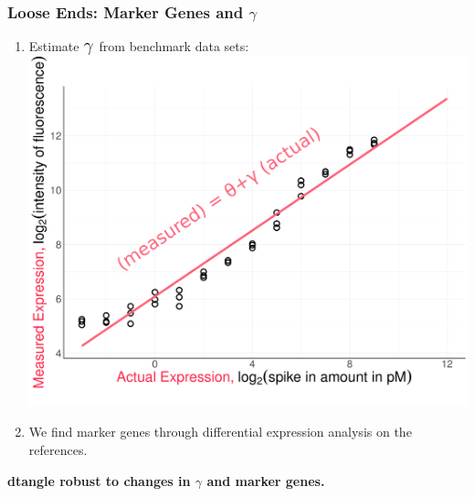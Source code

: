 \documentclass[usenames,dvipsnames,15pt]{beamer}
\renewcommand{\alert}[1]{{\color{NavyBlue} #1}}
\newcommand{\crb}{\color{RoyalBlue}}
\newcommand{\cbr}{\color{BrickRed}}
\newcommand{\tn}{\text{\Large $\theta$}_{\cbr g}}
\newcommand{\slope}{\text{\Large $\gamma$}}
\begin{document}
\begin{frame}
  \frametitle{Loose Ends: Marker Genes and $\gamma$}
  \begin{enumerate}
  \item Estimate $\slope$ from \alert{benchmark data sets}:
    \hspace*{2cm}\includegraphics[scale=.17]{pictures/ma_mod_plot}
  \item We find \alert{marker genes} through \alert{differential expression analysis} on the references.
  \end{enumerate}
  {\bf dtangle robust to changes in $\gamma$ and marker genes.}
\end{frame}

%  
\end{document}
